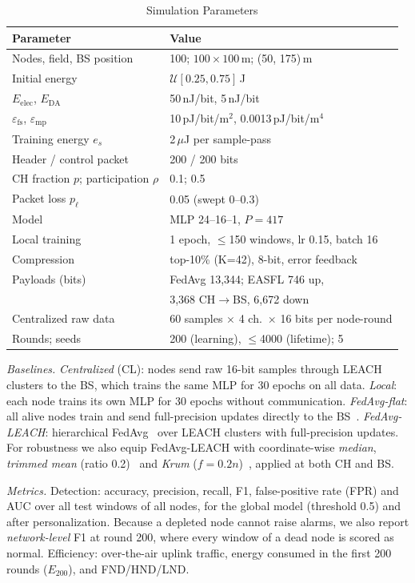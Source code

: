 \documentclass[journal]{IEEEtran}
\begin{document}
\begin{table}[t]
\caption{Simulation Parameters}\label{tab:params}
\centering\scriptsize
\begin{tabular}{@{}ll@{}}
\toprule
Parameter & Value\\
\midrule
Nodes, field, BS position & 100; $100\times100$\,m; (50, 175)\,m\\
Initial energy & $\mathcal{U}[0.25,0.75]$\,J\\
$E_{\mathrm{elec}}$, $E_{\mathrm{DA}}$ & 50\,nJ/bit, 5\,nJ/bit\\
$\varepsilon_{\mathrm{fs}}$, $\varepsilon_{\mathrm{mp}}$ & 10\,pJ/bit/m$^2$, 0.0013\,pJ/bit/m$^4$\\
Training energy $e_s$ & 2\,$\mu$J per sample-pass\\
Header / control packet & 200 / 200 bits\\
CH fraction $p$; participation $\rho$ & 0.1; 0.5\\
Packet loss $p_\ell$ & 0.05 (swept 0--0.3)\\
Model & MLP 24--16--1, $P=417$\\
Local training & 1 epoch, $\le$150 windows, lr 0.15, batch 16\\
Compression & top-10\% (K=42), 8-bit, error feedback\\
Payloads (bits) & FedAvg 13,344; EASFL 746 up,\\
 & 3,368 CH$\to$BS, 6,672 down\\
Centralized raw data & 60 samples $\times$ 4 ch.\ $\times$ 16 bits per node-round\\
Rounds; seeds & 200 (learning), $\le$4000 (lifetime); 5\\
\bottomrule
\end{tabular}
\end{table}

\textit{Baselines.} \emph{Centralized} (CL): nodes send raw 16-bit samples through LEACH clusters to the BS, which trains the same MLP for 30 epochs on all data. \emph{Local}: each node trains its own MLP for 30 epochs without communication. \emph{FedAvg-flat}: all alive nodes train and send full-precision updates directly to the BS~\cite{mcmahan2017}. \emph{FedAvg-LEACH}: hierarchical FedAvg~\cite{liu2020hfl} over LEACH clusters with full-precision updates. For robustness we also equip FedAvg-LEACH with coordinate-wise \emph{median}, \emph{trimmed mean} (ratio 0.2)~\cite{yin2018} and \emph{Krum} ($f=0.2n$)~\cite{blanchard2017}, applied at both CH and BS.

\textit{Metrics.} Detection: accuracy, precision, recall, F1, false-positive rate (FPR) and AUC over all test windows of all nodes, for the global model (threshold 0.5) and after personalization. Because a depleted node cannot raise alarms, we also report \emph{network-level} F1 at round 200, where every window of a dead node is scored as normal. Efficiency: over-the-air uplink traffic, energy consumed in the first 200 rounds ($E_{200}$), and FND/HND/LND.
\end{document}
